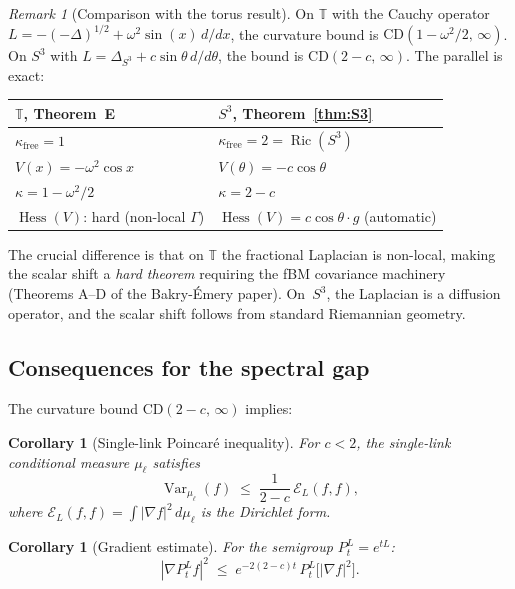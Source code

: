 \documentclass[11pt,a4paper]{article}
\theoremstyle{plain}
\newtheorem{corollary}[theorem]{Corollary}
\theoremstyle{definition}
\theoremstyle{remark}
\newtheorem{remark}[theorem]{Remark}
\newcommand{\T}{\mathbb{T}}
\newcommand{\Hess}{\operatorname{Hess}}
\newcommand{\Ric}{\operatorname{Ric}}
\newcommand{\Var}{\operatorname{Var}}
\begin{document}
\begin{remark}[Comparison with the torus result]
On $\T$ with the Cauchy operator $L = -(-\Delta)^{1/2} + \omega^2
\sin(x)\,d/dx$, the curvature bound is $\mathrm{CD}(1-\omega^2/2,\,
\infty)$.  On $S^3$ with $L = \Delta_{S^3} + c\sin\theta\,d/d\theta$,
the bound is $\mathrm{CD}(2-c,\,\infty)$.  The parallel is exact:
\begin{center}
\renewcommand{\arraystretch}{1.3}
\begin{tabular}{ll}
\toprule
$\T$, Theorem~E & $S^3$, Theorem~\ref{thm:S3} \\
\midrule
$\kappa_{\mathrm{free}} = 1$ & $\kappa_{\mathrm{free}} = 2 = \Ric(S^3)$ \\
$V(x) = -\omega^2\cos x$ & $V(\theta) = -c\cos\theta$ \\
$\kappa = 1 - \omega^2/2$ & $\kappa = 2 - c$ \\
$\Hess(V)$: hard (non-local $\Gamma$) & $\Hess(V) = c\cos\theta \cdot g$
  (automatic) \\
\bottomrule
\end{tabular}
\end{center}
The crucial difference is that on $\T$ the fractional Laplacian is
non-local, making the scalar shift a \emph{hard theorem} requiring the
fBM covariance machinery (Theorems A--D of the Bakry-\'{E}mery paper).
On~$S^3$, the Laplacian is a diffusion operator, and the scalar shift
follows from standard Riemannian geometry.
\end{remark}

\subsection{Consequences for the spectral gap}

The curvature bound $\mathrm{CD}(2-c,\,\infty)$ implies:

\begin{corollary}[Single-link Poincar\'{e} inequality]\label{cor:poincare}
For $c < 2$, the single-link conditional measure $\mu_\ell$ satisfies
\begin{equation}
  \Var_{\mu_\ell}(f) \;\le\; \frac{1}{2-c}\,\mathcal{E}_L(f,f),
\end{equation}
where $\mathcal{E}_L(f,f) = \int |\nabla f|^2\,d\mu_\ell$ is the
Dirichlet form.
\end{corollary}

\begin{corollary}[Gradient estimate]
For the semigroup $P_t^L = e^{tL}$:
\begin{equation}
  |\nabla P_t^L f|^2 \;\le\; e^{-2(2-c)t}\, P_t^L\!\bigl[|\nabla f|^2\bigr].
\end{equation}
\end{corollary}
\end{document}
